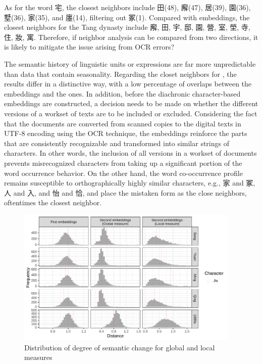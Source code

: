 As for the word 宅, the closest neighbors include 田(48), 廨(47), 居(39), 園(36), 墅(36), 家(35), and 廛(14), filtering out 冢(1). Compared with  embeddings, the closest neighbors for the Tang dynasty include 廨, 田, 宇, 邸, 園, 營, 室, 塋, 寺, 住, 妝, 寓. Therefore, if neighbor analysis can be compared from two directions, it is likely to mitigate the issue arising from OCR errors?

The semantic history of linguistic units or expressions are far more unpredictable than data that contain seasonality. Regarding the closet neighbors for \jia , the results differ in a distinctive way, with a low percentage of overlaps between the  embeddings and the  ones. In addition, before the diachronic character-based embeddings are constructed, a decision needs to be made on whether the different versions of a workset of texts are to be included or excluded. Considering the fact that the documents are converted from scanned copies to the digital texts in UTF-8 encoding using the OCR technique, the  embeddings reinforce the parts that are consistently recognizable and transformed into similar strings of characters. In other words, the inclusion of all versions in a workset of documents prevents misrecognized characters from taking up a significant portion of the word occurrence behavior. On the other hand, the word co-occurrence profile remains susceptible to orthographically highly similar characters, e.g., 家 and 冢, 人 and 入, and 怡 and 恰, and place the mistaken form as the close neighbors, oftentimes the closest neighbor.

\begin{figure}[H]
  \centering
  \includegraphics[width=0.95\textwidth,height=0.95\textheight,keepaspectratio]{figures_new/measures/dist_hist_w5.pdf}
  \caption{Distribution of degree of semantic change for global and local measures}
\end{figure}

